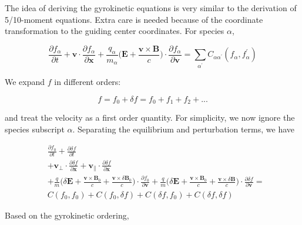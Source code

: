 \documentclass[
  notoc %
]{tufte-book}
\begin{document}
The idea of deriving the gyrokinetic equations is very similar to the
derivation of 5/10-moment equations. Extra care is needed because of the
coordinate transformation to the guiding center coordinates. For species
\(\alpha\),

\[
\frac{\partial f_\alpha}{\partial t} + \mathbf{v}\cdot\frac{\partial f_\alpha}{\partial\mathbf{x}} + \frac{q_\alpha}{m_\alpha}\Big( \mathbf{E}+\frac{\mathbf{v}\times\mathbf{B}}{c} \Big)\cdot\frac{\partial f_\alpha}{\partial \mathbf{v}} = \sum_{\alpha^\prime} C_{\alpha\alpha^\prime}(f_\alpha, f_\alpha^\prime)
\]

We expand \(f\) in different orders:

\[
f = f_0 + \delta f = f_0 + f_1 + f_2 + ...
\]

and treat the velocity as a first order quantity. For simplicity, we now
ignore the species subscript \(\alpha\). Separating the equilibrium and
perturbation terms, we have

\[
\begin{aligned}
&\frac{\partial f_0}{\partial t} + \frac{\partial \delta f}{\partial t} \\
&+ \mathbf{v}_\perp\cdot\frac{\partial \delta f}{\partial\mathbf{x}} + \mathbf{v}_\parallel\cdot\frac{\partial \delta f}{\partial\mathbf{x}} \\
&+ \frac{q}{m}\Big( \delta\mathbf{E}+\frac{\mathbf{v}\times\mathbf{B}_0}{c} + \frac{\mathbf{v}\times\delta\mathbf{B}_0}{c} \Big)\cdot\frac{\partial f_0}{\partial \mathbf{v}} + \frac{q}{m}\Big( \delta\mathbf{E}+\frac{\mathbf{v}\times\mathbf{B}_0}{c}+\frac{\mathbf{v}\times\delta\mathbf{B}}{c} \Big)\cdot\frac{\partial \delta f}{\partial \mathbf{v}} = \\
&C(f_0, f_0) + C(f_0, \delta f) + C(\delta f, f_0) + C(\delta f, \delta f)
\end{aligned}
\]

Based on the gyrokinetic ordering,
\end{document}
